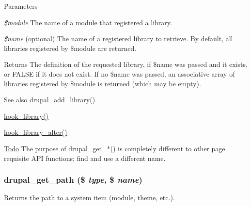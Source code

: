 \begin{DoxyParams}{Parameters}
\item[{\em \$module}]The name of a module that registered a library. \item[{\em \$name}](optional) The name of a registered library to retrieve. By default, all libraries registered by \$module are returned.\end{DoxyParams}
\begin{DoxyReturn}{Returns}
The definition of the requested library, if \$name was passed and it exists, or FALSE if it does not exist. If no \$name was passed, an associative array of libraries registered by \$module is returned (which may be empty).
\end{DoxyReturn}
\begin{DoxySeeAlso}{See also}
\hyperlink{common_8inc_a10d0b7349429391743b9ffc49b48908a}{drupal\_\-add\_\-library()} 

\hyperlink{group__hooks_ga6bf3f83fa2e373836f5aa78fd143d1cd}{hook\_\-library()} 

\hyperlink{group__hooks_ga7256c50068666c9c02f43a08efcefae7}{hook\_\-library\_\-alter()}
\end{DoxySeeAlso}
\begin{Desc}
\item[\hyperlink{todo__todo000001}{Todo}]The purpose of drupal\_\-get\_\-$\ast$() is completely different to other page requisite API functions; find and use a different name. \end{Desc}
\hypertarget{common_8inc_ae3bbe8f97bf07bb0eaf4580c98f9bf94}{
\subsubsection[{drupal\_\-get\_\-path}]{\setlength{\rightskip}{0pt plus 5cm}drupal\_\-get\_\-path (\$ {\em type}, \/  \$ {\em name})}}
\label{common_8inc_ae3bbe8f97bf07bb0eaf4580c98f9bf94}
Returns the path to a system item (module, theme, etc.).


